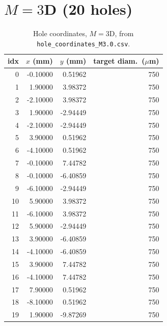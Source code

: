 \section{$M=3$D (20 holes)}
\begin{longtable}{rrrr}
\caption{Hole coordinates, $M=3$D, from \texttt{hole\_coordinates\_M3.0.csv}.}\\
\toprule
idx & $x$ (mm) & $y$ (mm) & target diam.\ ($\mu$m) \\
\midrule
\endhead
0 & -0.10000 & 0.51962 & 750 \\
1 & 1.90000 & 3.98372 & 750 \\
2 & -2.10000 & 3.98372 & 750 \\
3 & 1.90000 & -2.94449 & 750 \\
4 & -2.10000 & -2.94449 & 750 \\
5 & 3.90000 & 0.51962 & 750 \\
6 & -4.10000 & 0.51962 & 750 \\
7 & -0.10000 & 7.44782 & 750 \\
8 & -0.10000 & -6.40859 & 750 \\
9 & -6.10000 & -2.94449 & 750 \\
10 & 5.90000 & 3.98372 & 750 \\
11 & -6.10000 & 3.98372 & 750 \\
12 & 5.90000 & -2.94449 & 750 \\
13 & 3.90000 & -6.40859 & 750 \\
14 & -4.10000 & -6.40859 & 750 \\
15 & 3.90000 & 7.44782 & 750 \\
16 & -4.10000 & 7.44782 & 750 \\
17 & 7.90000 & 0.51962 & 750 \\
18 & -8.10000 & 0.51962 & 750 \\
19 & 1.90000 & -9.87269 & 750 \\
\bottomrule
\end{longtable}

